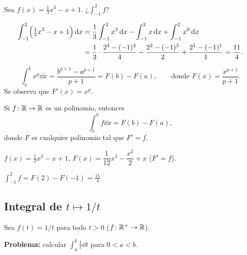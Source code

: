 \documentclass[11pt,a4paper]{article}
\begin{document}
\begin{ejemplo}
Sea $f(x)=\frac{1}{3}x^3-x+1$. ¿$\displaystyle\int_{-1}^2 f$?
\begin{center}
\end{center}
\begin{align*}
  \int_{-1}^2\Bigl(\tfrac13x^3-x+1\Bigr)\,\mathrm{d} x
  &=\frac13\int_{-1}^2x^3\,\mathrm{d} x-\int_{-1}^2x\,\mathrm{d} x+\int_{-1}^2x^0\,\mathrm{d} x\\
  &=\frac13\cdot\frac{2^4-(-1)^4}{4}-\frac{2^2-(-1)^2}{2}+\frac{2^1-(-1)^1}{1}=\frac{11}{4}.
\end{align*}
\end{ejemplo}

\[
  \int_a^b x^p\dd x=\frac{b^{p+1}-a^{p+1}}{p+1}=F(b)-F(a),
  \qquad\text{donde } F(x)=\frac{x^{p+1}}{p+1}.
\]
Se observa que $F'(x)=x^p$.

\begin{proposicion}
Si $f\colon\mathbb{R}\to\mathbb{R}$ es un polinomio, entonces
\[
  \int_a^b f\dd x=F(b)-F(a),
\]
donde $F$ es cualquier polinomio tal que $F'=f$.
\end{proposicion}

\begin{ejemplo}
$f(x)=\frac13x^3-x+1$, \qquad $F(x)=\dfrac{1}{12}x^4-\dfrac{x^2}{2}+x$ \qquad ($F'=f$).
\begin{center}
$\displaystyle\int_{-1}^2 f=F(2)-F(-1)=\frac{11}{4}$
\end{center}
\end{ejemplo}


\subsection{Integral de $t\mapsto 1/t$}

Sea $f(t)=1/t$ para todo $t>0$ \quad ($f\colon\mathbb{R}^+\to\mathbb{R}$).

\textbf{Problema:} calcular $\displaystyle\int_a^b\frac{1}{t}\dd t$ para $0<a<b$.
\end{document}
